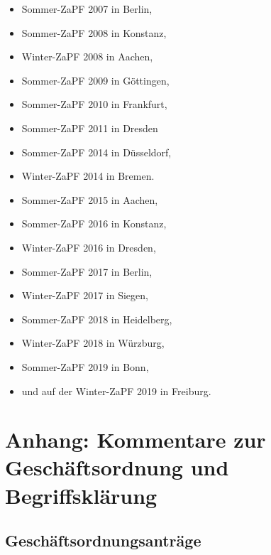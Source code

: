 \documentclass[12pt,oneside]{scrartcl}
\begin{document}
\begin{itemize}
\item Sommer-ZaPF 2007 in Berlin,

\item Sommer-ZaPF 2008 in Konstanz,

\item Winter-ZaPF 2008 in Aachen,

\item Sommer-ZaPF 2009 in Göttingen,

\item Sommer-ZaPF 2010 in Frankfurt,

\item Sommer-ZaPF 2011 in Dresden

\item Sommer-ZaPF 2014 in Düsseldorf,

\item Winter-ZaPF 2014 in Bremen.

\item Sommer-ZaPF 2015 in Aachen,

\item Sommer-ZaPF 2016 in Konstanz,

\item Winter-ZaPF 2016 in Dresden,

\item Sommer-ZaPF 2017 in Berlin,

\item Winter-ZaPF 2017 in Siegen,

\item Sommer-ZaPF 2018 in Heidelberg,

\item Winter-ZaPF 2018 in Würzburg,

\item Sommer-ZaPF 2019 in Bonn,

\item und auf der Winter-ZaPF 2019 in Freiburg.
\end{itemize}


\section{Anhang: Kommentare zur Geschäftsordnung und Begriffsklärung%
  \label{anhang-kommentare-zur-geschaftsordnung-und-begriffsklarung}%
}


\subsection{Geschäftsordnungsanträge%
  \label{id1}%
}
\end{document}
